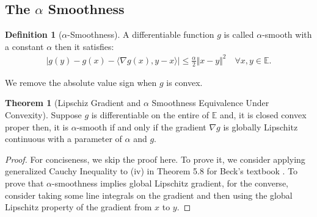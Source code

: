 \documentclass[]{article}
\theoremstyle{definition}
\newtheorem{theorem}{Theorem}       %
\newtheorem{definition}{Definition}
\begin{document}
    \subsection{The $\alpha$ Smoothness}
        \begin{definition}[$\alpha$-Smoothness]\label{def:strong_smoothness}
            A differentiable function $g$ is called $\alpha$-smooth with a constant $\alpha$ then it satisfies: 
            \begin{align}
                |g(y) - g(x) - 
                \langle \nabla g(x), y - x
                \rangle| \le \frac{\alpha}{2}\Vert x - y\Vert^2
                \quad \forall x, y\in \mathbb E. 
            \end{align}    
        \end{definition}
        We remove the absolute value sign when $g$ is convex. 
        \begin{theorem}[Lipschiz Gradient and $\alpha$ Smoothness Equivalence Under Convexity]\label{thm:cvx_lipz_grad}
            Suppose $g$ is differentiable on the entire of $\mathbb E$ and, it is closed convex proper then, it is $\alpha$-smooth if and only if the gradient $\nabla g$ is globally Lipschitz continuous with a parameter of $\alpha$ and $g$.
        \end{theorem}
        \begin{proof}
            For conciseness, we skip the proof here. To prove it, we consider applying generalized Cauchy Inequality to (iv) in Theorem 5.8 for Beck's textbook \cite{book:first_order_opt}. To prove that $\alpha$-smoothness implies global Lipschitz gradient, for the converse, consider taking some line integrals on the gradient and then using the global Lipschitz property of the gradient from $x$ to $y$. 
        \end{proof}
        
\end{document}
